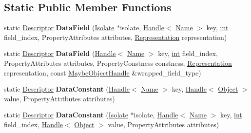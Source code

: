 \subsection*{Static Public Member Functions}
\begin{DoxyCompactItemize}
\item 
\mbox{\label{classv8_1_1internal_1_1Descriptor_a86fc04f5c7c55e48b958369734401b6d}} 
static \mbox{\hyperlink{classv8_1_1internal_1_1Descriptor}{Descriptor}} {\bfseries Data\+Field} (\mbox{\hyperlink{classv8_1_1internal_1_1Isolate}{Isolate}} $\ast$isolate, \mbox{\hyperlink{classv8_1_1internal_1_1Handle}{Handle}}$<$ \mbox{\hyperlink{classv8_1_1internal_1_1Name}{Name}} $>$ key, \mbox{\hyperlink{classint}{int}} field\+\_\+index, Property\+Attributes attributes, \mbox{\hyperlink{classv8_1_1internal_1_1Representation}{Representation}} representation)
\item 
\mbox{\label{classv8_1_1internal_1_1Descriptor_aff4e2d1ea7f1a3361ee3fc7e83106080}} 
static \mbox{\hyperlink{classv8_1_1internal_1_1Descriptor}{Descriptor}} {\bfseries Data\+Field} (\mbox{\hyperlink{classv8_1_1internal_1_1Handle}{Handle}}$<$ \mbox{\hyperlink{classv8_1_1internal_1_1Name}{Name}} $>$ key, \mbox{\hyperlink{classint}{int}} field\+\_\+index, Property\+Attributes attributes, Property\+Constness constness, \mbox{\hyperlink{classv8_1_1internal_1_1Representation}{Representation}} representation, const \mbox{\hyperlink{classv8_1_1internal_1_1MaybeObjectHandle}{Maybe\+Object\+Handle}} \&wrapped\+\_\+field\+\_\+type)
\item 
\mbox{\label{classv8_1_1internal_1_1Descriptor_a2f6448fee4fa0af593a2c35b4fe783a5}} 
static \mbox{\hyperlink{classv8_1_1internal_1_1Descriptor}{Descriptor}} {\bfseries Data\+Constant} (\mbox{\hyperlink{classv8_1_1internal_1_1Handle}{Handle}}$<$ \mbox{\hyperlink{classv8_1_1internal_1_1Name}{Name}} $>$ key, \mbox{\hyperlink{classv8_1_1internal_1_1Handle}{Handle}}$<$ \mbox{\hyperlink{classv8_1_1internal_1_1Object}{Object}} $>$ value, Property\+Attributes attributes)
\item 
\mbox{\label{classv8_1_1internal_1_1Descriptor_a1c1e612dc28b519ba85d9e234e114150}} 
static \mbox{\hyperlink{classv8_1_1internal_1_1Descriptor}{Descriptor}} {\bfseries Data\+Constant} (\mbox{\hyperlink{classv8_1_1internal_1_1Isolate}{Isolate}} $\ast$isolate, \mbox{\hyperlink{classv8_1_1internal_1_1Handle}{Handle}}$<$ \mbox{\hyperlink{classv8_1_1internal_1_1Name}{Name}} $>$ key, \mbox{\hyperlink{classint}{int}} field\+\_\+index, \mbox{\hyperlink{classv8_1_1internal_1_1Handle}{Handle}}$<$ \mbox{\hyperlink{classv8_1_1internal_1_1Object}{Object}} $>$ value, Property\+Attributes attributes)

\end{DoxyCompactItemize}
